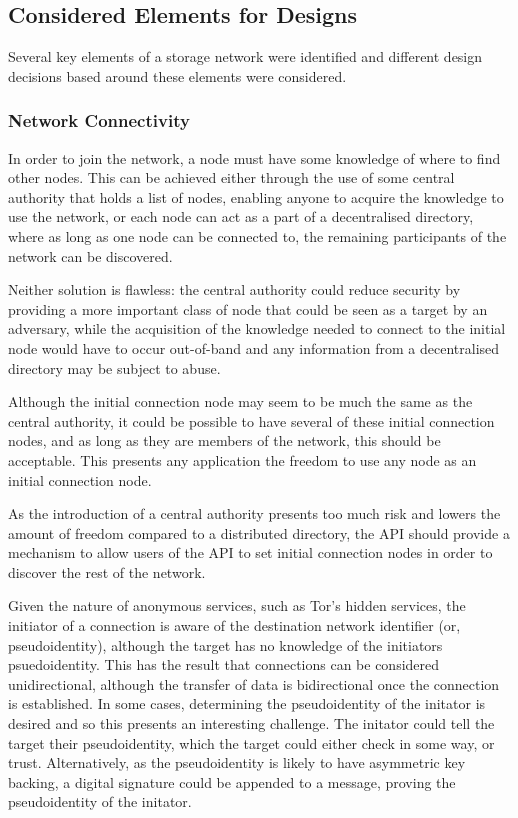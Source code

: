 	\subsection{Considered Elements for Designs}
		Several key elements of a storage network were identified and different design decisions based around these elements were considered. 
		
		\subsubsection{Network Connectivity}
			In order to join the network, a node must have some knowledge of where to find other nodes. This can be achieved either through the use of some central authority that holds a list of nodes, enabling anyone to acquire the knowledge to use the network, or each node can act as a part of a decentralised directory, where as long as one node can be connected to, the remaining participants of the network can be discovered.
			
			Neither solution is flawless: the central authority could reduce security by providing a more important class of node that could be seen as a target by an adversary, while the acquisition of the knowledge needed to connect to the initial node would have to occur out-of-band and any information from a decentralised directory may be subject to abuse.
			
			Although the initial connection node may seem to be much the same as the central authority, it could be possible to have several of these initial connection nodes, and as long as they are members of the network, this should be acceptable. This presents any application the freedom to use any node as an initial connection node.
			
			As the introduction of a central authority presents too much risk and lowers the amount of freedom compared to a distributed directory, the API should provide a mechanism to allow users of the API to set initial connection nodes in order to discover the rest of the network.
			
			Given the nature of anonymous services, such as Tor's hidden services, the initiator of a connection is aware of the destination network identifier (or, pseudoidentity), although the target has no knowledge of the initiators psuedoidentity. This has the result that connections can be considered unidirectional, although the transfer of data is bidirectional once the connection is established. In some cases, determining the pseudoidentity of the initator is desired and so this presents an interesting challenge. The initator could tell the target their pseudoidentity, which the target could either check in some way, or trust. Alternatively, as the pseudoidentity is likely to have asymmetric key backing, a digital signature could be appended to a message, proving the pseudoidentity of the initator. 
			
